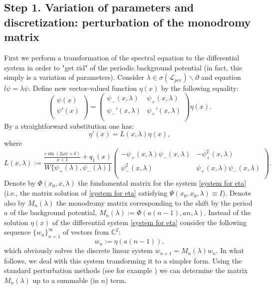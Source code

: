 \documentclass[a4paper,oneside,12pt]{amsart}
\begin{document}
\subsection*{Step 1. Variation of parameters and discretization: perturbation of the monodromy matrix}
First we perform a transformation of the spectral equation to the differential system in order to "get rid" of the periodic background potential (in fact, this simply is a variation of parameters). Consider $\lambda\in\sigma(\mathcal L_{per})\backslash\partial$ and equation $l\psi=\lambda\psi$. Define new vector-valued function $\eta(x)$ by the following equality:
\begin{equation*}
    \left(    \begin{array}{c}
    \psi(x) \\
    \psi'(x) \\
    \end{array}    \right)
    =
    \left(    \begin{array}{cc}
    \psi_-(x,\lambda) & \psi_+(x,\lambda) \\
    \psi_-'(x,\lambda) & \psi_+'(x,\lambda) \\
    \end{array}    \right)
    \eta(x).
\end{equation*}
By a straightforward substitution one has:
\begin{equation}\label{system for eta}
    \eta'(x)=L(x,\lambda)\eta(x),
\end{equation}
where
\begin{equation*}
    L(x,\lambda):=
    \frac{\frac{c\sin(2\omega x+\delta)}{x+1}+q_1(x)}{W\{\psi_+(\lambda),\psi_-(\lambda)\}}
    \left(    \begin{array}{cc}
    -\psi_+(x,\lambda)\psi_-(x,\lambda) & -\psi_+^2(x,\lambda) \\
    \psi_-^2(x,\lambda) & \psi_+(x,\lambda)\psi_-(x,\lambda) \\
    \end{array}    \right).
\end{equation*}
Denote by $\Phi(x_0,x,\lambda)$ the fundamental matrix for the system \eqref{system for eta} (i.e., the matrix solution of \eqref{system for eta} satisfying $\Psi(x_0,x_0,\lambda)\equiv I$). Denote also by $M_n(\lambda)$ the monodromy matrix corresponding to the shift by the period $a$ of the background potential, $M_n(\lambda):=\Phi(a(n-1),an,\lambda)$. Instead of the solution $\eta(x)$ of the differential system \eqref{system for eta} consider the following sequence $\{w_n\}_{n=1}^{\infty}$ of vectors from $\mathbb C^2$:
\begin{equation*}
    w_n:=\eta(a(n-1)),
\end{equation*}
which obviously solves the discrete linear system $w_{n+1}=M_n(\lambda)w_n$. In what follows, we deal with this system  transforming it to a simpler form. Using the standard perturbation methods (see for example \cite{Kurasov-Naboko-2007}) we can determine the matrix $M_n(\lambda)$ up to a summable (in $n$) term.
\end{document}

